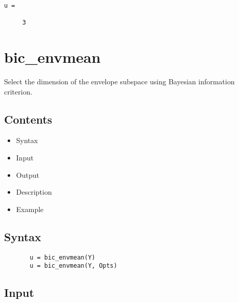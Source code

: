 \documentclass[a4paper,11pt,openany]{memoir}
\begin{document}
        \color{lightgray} \begin{verbatim}
u =

     3

\end{verbatim} \color{black}
    

\newpage

\rmfamily
\color{black}\section{bic\_envmean}

\begin{par}
Select the dimension of the envelope subspace using Bayesian information criterion.
\end{par} \vspace{1em}

\subsection*{Contents}

\begin{itemize}
\setlength{\itemsep}{-1ex}
   \item Syntax
   \item Input
   \item Output
   \item Description
   \item Example
\end{itemize}


\subsection*{Syntax}


\begin{verbatim}       u = bic_envmean(Y)
       u = bic_envmean(Y, Opts)\end{verbatim}
    

\subsection*{Input}
\end{document}
